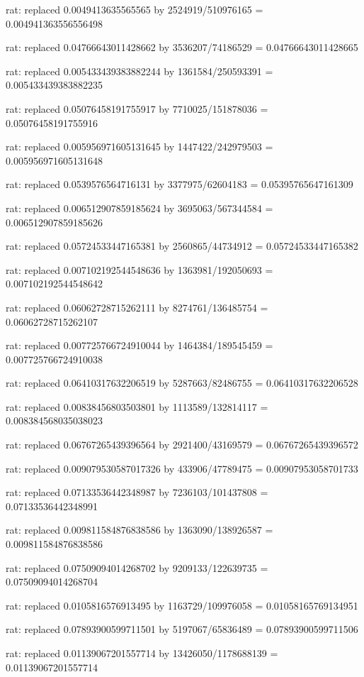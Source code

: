 \documentclass[a4paper,10pt]{article}
\begin{document}
\begin{eulernotebook}
\begin{eulercomment}
\begin{eulercomment}
\begin{eulercomment}
\begin{eulercomment}
\begin{eulercomment}
\begin{eulercomment}
\begin{eulercomment}
\begin{eulercomment}
\begin{eulercomment}
\begin{eulercomment}
\begin{eulercomment}
\begin{eulercomment}
\begin{eulercomment}
\begin{eulercomment}
\begin{eulercomment}
\begin{eulercomment}
\begin{euleroutput}
  rat: replaced 0.0049413635565565 by 2524919/510976165 = 0.004941363556556498
  
  rat: replaced 0.04766643011428662 by 3536207/74186529 = 0.04766643011428665
  
  rat: replaced 0.005433439383882244 by 1361584/250593391 = 0.005433439383882235
  
  rat: replaced 0.05076458191755917 by 7710025/151878036 = 0.05076458191755916
  
  rat: replaced 0.005956971605131645 by 1447422/242979503 = 0.005956971605131648
  
  rat: replaced 0.0539576564716131 by 3377975/62604183 = 0.05395765647161309
  
  rat: replaced 0.006512907859185624 by 3695063/567344584 = 0.006512907859185626
  
  rat: replaced 0.05724533447165381 by 2560865/44734912 = 0.05724533447165382
  
  rat: replaced 0.007102192544548636 by 1363981/192050693 = 0.007102192544548642
  
  rat: replaced 0.06062728715262111 by 8274761/136485754 = 0.06062728715262107
  
  rat: replaced 0.007725766724910044 by 1464384/189545459 = 0.007725766724910038
  
  rat: replaced 0.06410317632206519 by 5287663/82486755 = 0.06410317632206528
  
  rat: replaced 0.00838456803503801 by 1113589/132814117 = 0.008384568035038023
  
  rat: replaced 0.06767265439396564 by 2921400/43169579 = 0.06767265439396572
  
  rat: replaced 0.009079530587017326 by 433906/47789475 = 0.00907953058701733
  
  rat: replaced 0.07133536442348987 by 7236103/101437808 = 0.07133536442348991
  
  rat: replaced 0.009811584876838586 by 1363090/138926587 = 0.009811584876838586
  
  rat: replaced 0.07509094014268702 by 9209133/122639735 = 0.07509094014268704
  
  rat: replaced 0.0105816576913495 by 1163729/109976058 = 0.01058165769134951
  
  rat: replaced 0.07893900599711501 by 5197067/65836489 = 0.07893900599711506
  
  rat: replaced 0.01139067201557714 by 13426050/1178688139 = 0.01139067201557714
  

\end{euleroutput}
\end{eulercomment}
\end{eulercomment}
\end{eulercomment}
\end{eulercomment}
\end{eulercomment}
\end{eulercomment}
\end{eulercomment}
\end{eulercomment}
\end{eulercomment}
\end{eulercomment}
\end{eulercomment}
\end{eulercomment}
\end{eulercomment}
\end{eulercomment}
\end{eulercomment}
\end{eulercomment}
\end{eulernotebook}
\end{document}
